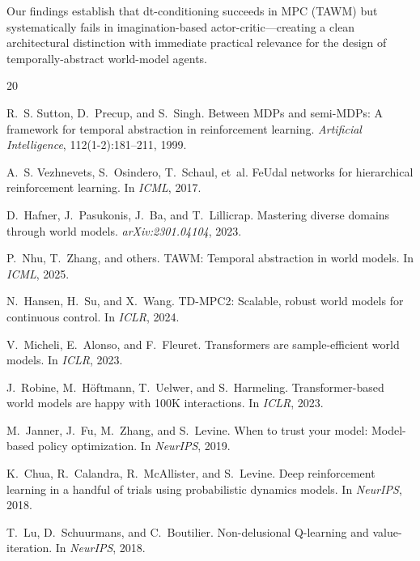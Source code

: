 \documentclass[10pt,letterpaper]{article}
\begin{document}
Our findings establish that dt-conditioning succeeds in MPC (TAWM) but systematically fails in imagination-based actor-critic---creating a clean architectural distinction with immediate practical relevance for the design of temporally-abstract world-model agents.


\begin{thebibliography}{20}

R.~S. Sutton, D.~Precup, and S.~Singh.
\newblock Between MDPs and semi-MDPs: A framework for temporal abstraction in reinforcement learning.
\newblock \emph{Artificial Intelligence}, 112(1-2):181--211, 1999.

A.~S. Vezhnevets, S.~Osindero, T.~Schaul, et~al.
\newblock FeUdal networks for hierarchical reinforcement learning.
\newblock In \emph{ICML}, 2017.

D.~Hafner, J.~Pasukonis, J.~Ba, and T.~Lillicrap.
\newblock Mastering diverse domains through world models.
\newblock \emph{arXiv:2301.04104}, 2023.

P.~Nhu, T.~Zhang, and others.
\newblock TAWM: Temporal abstraction in world models.
\newblock In \emph{ICML}, 2025.

N.~Hansen, H.~Su, and X.~Wang.
\newblock TD-MPC2: Scalable, robust world models for continuous control.
\newblock In \emph{ICLR}, 2024.

V.~Micheli, E.~Alonso, and F.~Fleuret.
\newblock Transformers are sample-efficient world models.
\newblock In \emph{ICLR}, 2023.

J.~Robine, M.~H{\"o}ftmann, T.~Uelwer, and S.~Harmeling.
\newblock Transformer-based world models are happy with 100K interactions.
\newblock In \emph{ICLR}, 2023.

M.~Janner, J.~Fu, M.~Zhang, and S.~Levine.
\newblock When to trust your model: Model-based policy optimization.
\newblock In \emph{NeurIPS}, 2019.

K.~Chua, R.~Calandra, R.~McAllister, and S.~Levine.
\newblock Deep reinforcement learning in a handful of trials using probabilistic dynamics models.
\newblock In \emph{NeurIPS}, 2018.

T.~Lu, D.~Schuurmans, and C.~Boutilier.
\newblock Non-delusional Q-learning and value-iteration.
\newblock In \emph{NeurIPS}, 2018.


\end{thebibliography}
\end{document}
